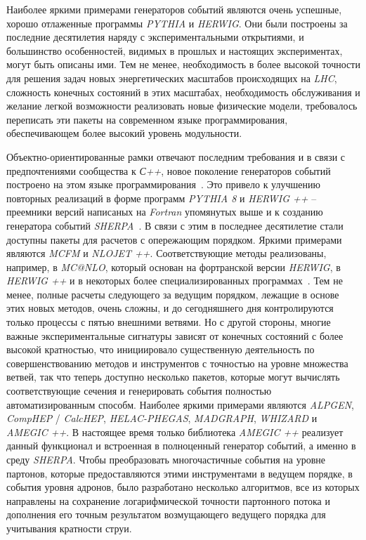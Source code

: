 Наиболее яркими примерами генераторов событий являются очень успешные, хорошо отлаженные программы
\textit{PYTHIA} и \textit{HERWIG}. Они были построены за последние десятилетия наряду с экспериментальными открытиями, и большинство особенностей, видимых в прошлых и настоящих экспериментах, могут быть описаны
ими. Тем не менее, необходимость в более высокой точности для решения задач новых энергетических масштабов происходящих
на \textit{LHC}, сложность конечных состояний в этих масштабах, необходимость обслуживания и желание легкой возможности реализовать новые физические модели, требовалось переписать эти пакеты на современном языке программирования, обеспечивающем более высокий уровень модульности.

Объектно-ориентированные рамки отвечают последним
требования и в связи с предпочтениями сообщества к \textit{С++}, новое поколение генераторов событий
построено на этом языке программирования~\cite{review-sherpa}. Это привело к улучшению повторных реализаций в форме
программ \textit{PYTHIA 8} и \textit{HERWIG ++} -- преемники версий написаных на \textit{Fortran} упомянутых выше
и к созданию генератора событий \textit{SHERPA}~\cite{review-sherpa}.
В связи с этим в последнее десятилетие стали доступны пакеты для расчетов с опережающим порядком. Яркими примерами являются \textit{MCFM} и \textit{NLOJET ++}. Соответствующие методы реализованы, например, в \textit{MC@NLO}, который основан
на фортранской версии \textit{HERWIG}, в \textit{HERWIG ++} и в некоторых более специализированных программах~\cite{review-sherpa}.
Тем не менее, полные расчеты следующего за ведущим порядком, лежащие в основе этих новых методов, очень сложны, и до сегодняшнего дня контролируются только процессы с пятью внешними ветвями. Но
с другой стороны, многие важные экспериментальные сигнатуры зависят от конечных состояний с более высокой кратностью, что
инициировало существенную деятельность по совершенствованию методов и инструментов с точностью на уровне множества ветвей, так что
теперь доступно несколько пакетов, которые могут вычислять соответствующие сечения и генерировать события
полностью автоматизированным способм. Наиболее яркими примерами являются \textit{ALPGEN}, \textit{CompHEP} / \textit{CalcHEP},
\textit{HELAC-PHEGAS}, \textit{MADGRAPH}, \textit{WHIZARD} и \textit{AMEGIC ++}. В настоящее время только библиотека \textit{AMEGIC ++} реализует данный функционал и встроенная в полноценный генератор событий, а именно в среду \textit{SHERPA}. Чтобы
преобразовать многочастичные события на уровне партонов, которые предоставляются этими инструментами в ведущем порядке, в
события уровня адронов, было разработано несколько алгоритмов, все из которых направлены на сохранение логарифмической
точности партонного потока и дополнения его точным результатом возмущающего ведущего порядка для
учитывания кратности струи.

